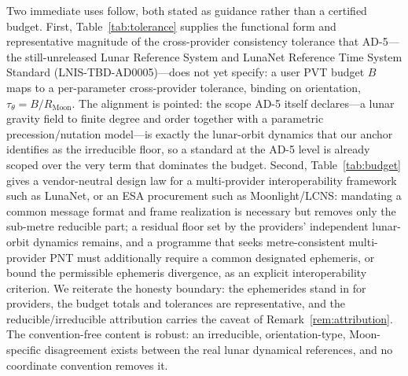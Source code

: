 Two immediate uses follow, both stated as \Modelled{} guidance rather than a
certified budget. First, Table~\ref{tab:tolerance} supplies the functional form and
representative magnitude of the cross-provider consistency tolerance that AD-5---the
still-unreleased Lunar Reference System and LunaNet Reference Time System Standard
({LNIS-TBD-AD0005})---does not yet specify: a user PVT budget $B$ maps to a
per-parameter cross-provider tolerance, binding on orientation,
$\tau_\theta=B/R_{\mathrm{Moon}}$. The alignment is pointed: the scope AD-5 itself
declares---a lunar gravity field to finite degree and order together with a parametric
precession/nutation model---is exactly the lunar-orbit dynamics that our anchor
identifies as the irreducible floor, so a standard at the AD-5 level is already scoped
over the very term that dominates the budget. Second, Table~\ref{tab:budget} gives a
vendor-neutral design law for a multi-provider interoperability framework such as
LunaNet, or an ESA procurement such as Moonlight/LCNS: mandating a common message
format and frame realization is necessary but removes only the sub-metre reducible
part; a residual floor set by the providers' independent lunar-orbit dynamics remains,
and a programme that seeks metre-consistent multi-provider PNT must additionally
require a common designated ephemeris, or bound the permissible ephemeris divergence,
as an explicit interoperability criterion. We reiterate the honesty boundary: the
ephemerides stand in for providers, the budget totals and tolerances are
representative, and the reducible/irreducible attribution carries the caveat of
Remark~\ref{rem:attribution}. The convention-free content is robust: an irreducible,
orientation-type, Moon-specific disagreement exists between the real lunar dynamical
references, and no coordinate convention removes it.
